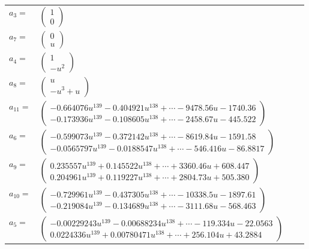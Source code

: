 \documentclass[1p]{elsarticle_modified}
\theoremstyle{definition}
\begin{document}
\begin{tabular}{m{7pt} m{180pt} m{7pt} m{180pt} }
\flushright $a_{3}=$&$\begin{pmatrix}1\\0\end{pmatrix}$ \\
\flushright $a_{7}=$&$\begin{pmatrix}0\\u\end{pmatrix}$ \\
\flushright $a_{4}=$&$\begin{pmatrix}1\\- u^2\end{pmatrix}$ \\
\flushright $a_{8}=$&$\begin{pmatrix}u\\- u^3+u\end{pmatrix}$ \\
\flushright $a_{11}=$&$\begin{pmatrix}-0.664076 u^{139}-0.404921 u^{138}+\cdots-9478.56 u-1740.36\\-0.173936 u^{139}-0.108605 u^{138}+\cdots-2458.67 u-445.522\end{pmatrix}$ \\
\flushright $a_{6}=$&$\begin{pmatrix}-0.599073 u^{139}-0.372142 u^{138}+\cdots-8619.84 u-1591.58\\-0.0565797 u^{139}-0.0188547 u^{138}+\cdots-546.416 u-86.8817\end{pmatrix}$ \\
\flushright $a_{9}=$&$\begin{pmatrix}0.235557 u^{139}+0.145522 u^{138}+\cdots+3360.46 u+608.447\\0.204961 u^{139}+0.119227 u^{138}+\cdots+2804.73 u+505.380\end{pmatrix}$ \\
\flushright $a_{10}=$&$\begin{pmatrix}-0.729961 u^{139}-0.437305 u^{138}+\cdots-10338.5 u-1897.61\\-0.219084 u^{139}-0.134689 u^{138}+\cdots-3111.68 u-568.463\end{pmatrix}$ \\
\flushright $a_{5}=$&$\begin{pmatrix}-0.00229243 u^{139}-0.00688234 u^{138}+\cdots-119.334 u-22.0563\\0.0224336 u^{139}+0.00780471 u^{138}+\cdots+256.104 u+43.2884\end{pmatrix}$ \\

\end{tabular}
\end{document}
